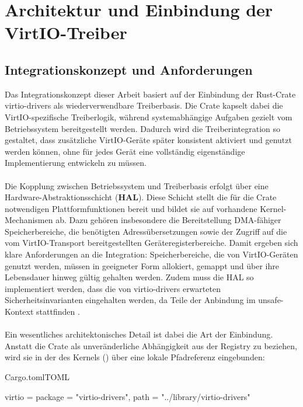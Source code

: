 \chapter{Architektur und Einbindung der VirtIO-Treiber}

\section{Integrationskonzept und Anforderungen}

Das Integrationskonzept dieser Arbeit basiert auf der Einbindung der Rust-Crate virtio-drivers als wiederverwendbare Treiberbasis. Die Crate kapselt dabei die VirtIO-spezifische Treiberlogik, während systemabhängige Aufgaben gezielt vom Betriebssystem bereitgestellt werden. Dadurch wird die Treiberintegration so gestaltet, dass zusätzliche VirtIO-Geräte später konsistent aktiviert und genutzt werden können, ohne für jedes Gerät eine vollständig eigenständige Implementierung entwickeln zu müssen.\\
\\
Die Kopplung zwischen Betriebssystem und Treiberbasis erfolgt über eine Hardware-Abstraktionsschicht (\textbf{HAL}). Diese Schicht stellt die für die Crate notwendigen Plattformfunktionen bereit und bildet sie auf vorhandene Kernel-Mechanismen ab. Dazu gehören insbesondere die Bereitstellung DMA-fähiger Speicherbereiche, die benötigten Adressübersetzungen sowie der Zugriff auf die vom VirtIO-Transport bereitgestellten Geräteregisterbereiche. Damit ergeben sich klare Anforderungen an die Integration: Speicherbereiche, die von VirtIO-Geräten genutzt werden, müssen in geeigneter Form allokiert, gemappt und über ihre Lebensdauer hinweg gültig gehalten werden. Zudem muss die HAL so implementiert werden, dass die von virtio-drivers erwarteten Sicherheitsinvarianten eingehalten werden, da Teile der Anbindung im unsafe-Kontext stattfinden \cite{VirtioDriversHalInfo}.\\
\\
Ein wesentliches architektonisches Detail ist dabei die Art der Einbindung. Anstatt die Crate als unveränderliche Abhängigkeit aus der Registry zu beziehen, wird sie in der  des Kernels () über eine lokale Pfadreferenz eingebunden:

\begin{codeblock}{Cargo.toml}{TOML}
  \begin{rustcode}
[dependencies]
virtio = { package = "virtio-drivers", path = "../library/virtio-drivers" }
  \end{rustcode}
\end{codeblock}

